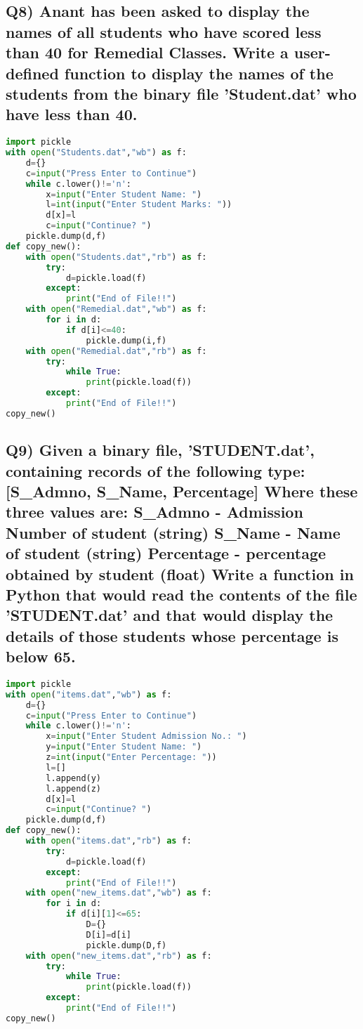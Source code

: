 \documentclass{article}
\begin{document}
\subsection*{Q8) Anant has been asked to display the names of all students who have scored less than 40 for Remedial Classes. Write a user-defined function to display the names of the students from the binary file 'Student.dat' who have less than 40.}
\begin{lstlisting}[language=Python]
import pickle
with open("Students.dat","wb") as f:
    d={}
    c=input("Press Enter to Continue")
    while c.lower()!='n':
        x=input("Enter Student Name: ")
        l=int(input("Enter Student Marks: "))
        d[x]=l
        c=input("Continue? ")
    pickle.dump(d,f)
def copy_new():
    with open("Students.dat","rb") as f:
        try:
            d=pickle.load(f)
        except:
            print("End of File!!")
    with open("Remedial.dat","wb") as f:
        for i in d:
            if d[i]<=40:
                pickle.dump(i,f)
    with open("Remedial.dat","rb") as f:
        try:
            while True:
                print(pickle.load(f))
        except:
            print("End of File!!")
copy_new()
\end{lstlisting}

\subsection*{Q9) Given a binary file, 'STUDENT.dat', containing records of the following type: [S\_Admno, S\_Name, Percentage] Where these three values are: S\_Admno - Admission Number of student (string) S\_Name - Name of student (string) Percentage - percentage obtained by student (float) Write a function in Python that would read the contents of the file 'STUDENT.dat' and that would display the details of those students whose percentage is below 65.}
\begin{lstlisting}[language=Python]
import pickle
with open("items.dat","wb") as f:
    d={}
    c=input("Press Enter to Continue")
    while c.lower()!='n':
        x=input("Enter Student Admission No.: ")
        y=input("Enter Student Name: ")
        z=int(input("Enter Percentage: "))
        l=[]
        l.append(y)
        l.append(z)
        d[x]=l
        c=input("Continue? ")
    pickle.dump(d,f)
def copy_new():
    with open("items.dat","rb") as f:
        try:
            d=pickle.load(f)
        except:
            print("End of File!!")
    with open("new_items.dat","wb") as f:
        for i in d:
            if d[i][1]<=65:
                D={}
                D[i]=d[i]
                pickle.dump(D,f)
    with open("new_items.dat","rb") as f:
        try:
            while True:
                print(pickle.load(f))
        except:
            print("End of File!!")
copy_new()
\end{lstlisting}
\end{document}
